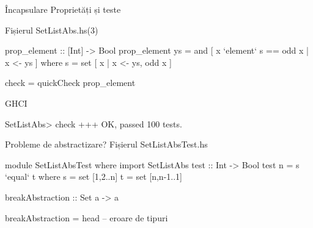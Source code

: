 \documentclass[xcolor=pdftex,romanian,colorlinks]{beamer}
\begin{document}
\begin{frame}[fragile]{Încapsulare}
{Proprietăți și teste}
\begin{block}{Fișierul SetListAbs.hs\hfill (3)}
\begin{asciihs}
prop_element :: [Int] -> Bool
prop_element ys =
    and [ x `element` s == odd x | x <- ys ]
  where
    s = set [ x | x <- ys, odd x ]

check =
    quickCheck prop_element
\end{asciihs}
\end{block}
\begin{block}{GHCI}
\begin{asciihs}
SetListAbs> check
+++ OK, passed 100 tests.
\end{asciihs}
\end{block}
\end{frame}


\begin{frame}[fragile]{Probleme de abstractizare?}
{Fișierul SetListAbsTest.hs}
\begin{asciihs}
module SetListAbsTest where
import SetListAbs
test :: Int -> Bool
test n =
   s `equal` t
  where
    s = set [1,2..n]
    t = set [n,n-1..1]

breakAbstraction :: Set a -> a
\end{asciihs}
\vspace{-2ex}
\begin{asciihs}
breakAbstraction = head   --  eroare de tipuri
\end{asciihs}
\end{frame}
\end{document}
